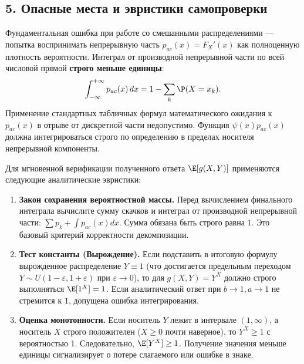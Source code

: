 \subsection*{5. Опасные места и эвристики самопроверки}

\begin{WarningBox}
Фундаментальная ошибка при работе со смешанными распределениями — попытка воспринимать непрерывную часть $p_{ac}(x) = F_X'(x)$ как полноценную плотность вероятности. 
Интеграл от производной непрерывной части по всей числовой прямой \textbf{строго меньше единицы}:
\[
    \int_{-\infty}^{+\infty} p_{ac}(x) \, dx = 1 - \sum_{k} \P(X = x_k).
\]
Применение стандартных табличных формул математического ожидания к $p_{ac}(x)$ в отрыве от дискретной части недопустимо. Функция $\psi(x)p_{ac}(x)$ должна интегрироваться строго по определению в пределах носителя непрерывной компоненты.
\end{WarningBox}

\begin{HackBox}
Для мгновенной верификации полученного ответа $\E[g(X, Y)]$ применяются следующие аналитические эвристики:
\begin{enumerate}
    \item \textbf{Закон сохранения вероятностной массы.} Перед вычислением финального интеграла вычислите сумму скачков и интеграл от производной непрерывной части: $\sum p_k + \int p_{ac}(x) dx$. Сумма обязана быть строго равна $1$. Это базовый критерий корректности декомпозиции.
    \item \textbf{Тест константы (Вырождение).} Если подставить в итоговую формулу вырожденное распределение $Y \equiv 1$ (что достигается предельным переходом $Y \sim U(1-\varepsilon, 1+\varepsilon)$ при $\varepsilon \to 0$), то для $g(X,Y) = Y^X$ должно строго выполняться $\E[1^X] = 1$. Если аналитический ответ при $b \to 1, a \to 1$ не стремится к $1$, допущена ошибка интегрирования.
    \item \textbf{Оценка монотонности.} Если носитель $Y$ лежит в интервале $(1, \infty)$, а носитель $X$ строго положителен ($X \ge 0$ почти наверное), то $Y^X \ge 1$ с вероятностью 1. Следовательно, $\E[Y^X] \ge 1$. Получение значения меньше единицы сигнализирует о потере слагаемого или ошибке в знаке.
\end{enumerate}
\end{HackBox}
